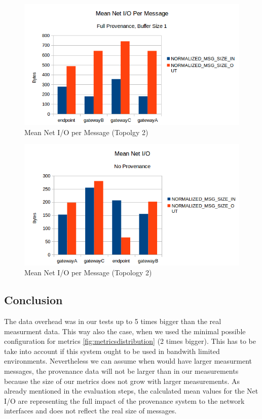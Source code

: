 \begin{figure}[H]
	\center
	\includegraphics[width=\textwidth]{figures/overheaddiagram5.png}
	\caption{Mean Net I/O per Message (Topolgy 2)}
	\label{fig:overhrad5}
\end{figure}

\begin{figure}[H]
	\center
	\includegraphics[width=\textwidth]{figures/overheaddiagram6.png}
	\caption{Mean Net I/O per Message (Topology 2)}
	\label{fig:overhead6}
\end{figure}


\subsection{Conclusion}
The data overhead was in our tests up to 5 times bigger than the real measurment data. This way also the case, when we used the minimal possible configuration for metrics \ref{fig:metricsdistribution} (2 times bigger).
This has to be take into account if this system ought to be used in bandwith limited environments.
Nevertheless we can assume when would have larger measurment messages, the provenance data will not be larger than in our measurements because the size of our metrics does not grow with larger measurements.
As already mentioned in the evaluation steps, the calculated mean values for the Net I/O are representing the full impact of the provenance system to the network interfaces and does not reflect the real size of messages.
